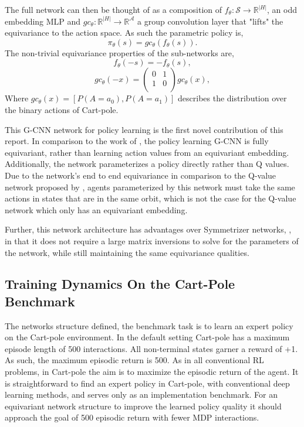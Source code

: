 The full network can then be thought of as a composition of $f_\theta : \mathcal{S} \rightarrow \mathbb{R}^{|H|}$, an odd embedding MLP and $gc_\theta: \mathbb{R}^{|H|} \rightarrow \mathbb{R}^{\mathcal{A}}$ a group convolution layer that "lifts" the equivariance to the action space. As such the parametric policy is,
\begin{equation}
	\pi_\theta(s) = gc_\theta(f_\theta(s)).
\end{equation}
The non-trivial equivariance properties of the sub-networks are,
\begin{equation}
	f_\theta(-s) = -f_\theta(s),
\end{equation}
\begin{equation}
	gc_\theta(-x) =
	\begin{pmatrix}
		0 & 1 \\
		1 & 0 \\
	\end{pmatrix}
	gc_\theta(x),
\end{equation}
Where $gc_\theta(x) = [P(A=a_0), P(A=a_1)]$ describes the distribution over the binary actions of Cart-pole.

This G-CNN network for policy learning is the first novel contribution of this report. In comparison to the work of \cite{mondal2020group}, the policy learning G-CNN is fully equivariant, rather than learning action values from an equivariant embedding. Additionally, the network parameterizes a policy directly rather than Q values. Due to the network's end to end equivariance in comparison to the Q-value network proposed by \cite{mondal2020group}, agents parameterized by this network must take the same actions in states that are in the same orbit, which is not the case for the Q-value network which only has an equivariant embedding.

Further, this network architecture has advantages over Symmetrizer networks, \cite{vanderpol2020mdp}, in that it does not require a large matrix inversions to solve for the parameters of the network, while still maintaining the same equivariance qualities.

\subsection{Training Dynamics On the Cart-Pole Benchmark}
The networks structure defined, the benchmark task is to learn an expert policy on the Cart-pole environment. In the default setting Cart-pole has a maximum episode length of 500 interactions. All non-terminal states garner a reward of +1. As such, the maximum episodic return is 500. As in all conventional RL problems, in Cart-pole the aim is to maximize the episodic return of the agent. It is straightforward to find an expert policy in Cart-pole, with conventional deep learning methods, and serves only as an implementation benchmark. For an equivariant network structure to improve the learned policy quality it should approach the goal of 500 episodic return with fewer MDP interactions.

